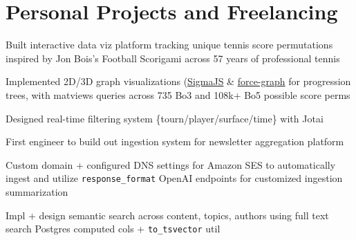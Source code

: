 \documentclass[]{deedy-resume}
\begin{document}
\begin{minipage}[t]{0.66\textwidth}

\section{Personal Projects and Freelancing}

\vspace{\topsep} %
\begin{tightitemize}
   \item Built interactive data viz platform tracking unique tennis score permutations inspired by Jon Bois's Football Scorigami across 57 years of professional tennis
   \item Implemented 2D/3D graph visualizations (\href{https://www.sigmajs.org/}{SigmaJS} \& \href{https://github.com/vasturiano/3d-force-graph}{force-graph} for progression trees, with matviews queries across 735 Bo3 and 108k+ Bo5 possible score perms
   \item Designed real-time filtering system \{tourn/player/surface/time\} with Jotai
\end{tightitemize}
\sectionspace

\begin{tightitemize}
    \item First engineer to build out ingestion system for newsletter aggregation platform
    \item Custom domain + configured DNS settings for Amazon SES to automatically ingest and utilize \texttt{response\_format} OpenAI endpoints for customized ingestion summarization
    \item Impl + design semantic search across content, topics, authors using full text search Postgres computed cols + \texttt{to\_tsvector} util
\end{tightitemize}
\sectionspace


\end{minipage}
\end{document}
